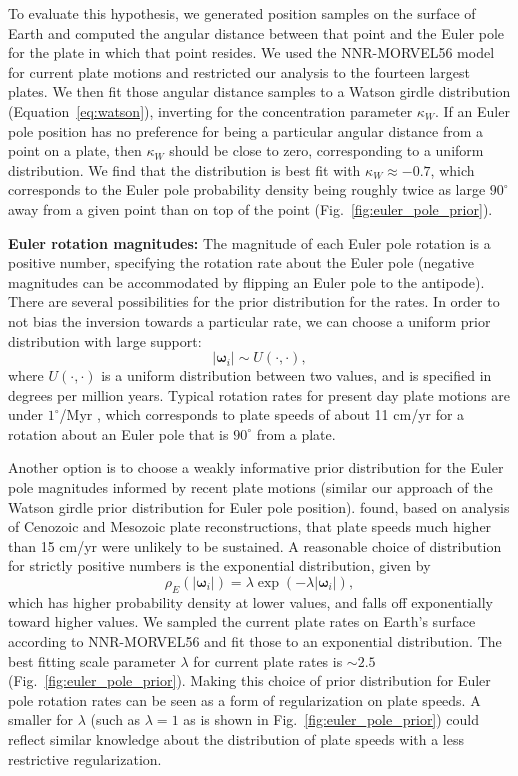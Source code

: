 \documentclass[]{agujournal2019}
\begin{document}
To evaluate this hypothesis, we generated position samples on the surface of Earth and computed the angular distance between that point and the Euler pole for the plate in which that point resides. We used the NNR-MORVEL56 model for current plate motions \cite{Argus2011a} and restricted our analysis to the fourteen largest plates. We then fit those angular distance samples to a Watson girdle distribution (Equation~\ref{eq:watson}),  inverting for the concentration parameter $\kappa_W$. If an Euler pole position has no preference for being a particular angular distance from a point on a plate, then $\kappa_W$ should be close to zero, corresponding to a uniform distribution. We find that the distribution is best fit with $\kappa_W \approx -0.7$, which corresponds to the Euler pole probability density being roughly twice as large $90^\circ$ away from a given point than on top of the point (Fig.~\ref{fig:euler_pole_prior}).

\textbf{Euler rotation magnitudes:} 
The magnitude of each Euler pole rotation is a positive number, specifying the rotation rate about the Euler pole (negative magnitudes can be accommodated by flipping an Euler pole to the antipode). There are several possibilities for the prior distribution for the rates. In order to not bias the inversion towards a particular rate, we can choose a uniform prior distribution with large support:
\begin{equation}
\vert \mathbf{\omega}_i \vert \sim U(\cdot, \cdot),
\end{equation}
where $U(\cdot, \cdot)$ is a uniform distribution between two values, and is specified in degrees per million years. Typical rotation rates for present day plate motions are under $1^\circ$/Myr \cite{Argus2011a}, which corresponds to plate speeds of about 11 cm/yr for a rotation about an Euler pole that is $90^\circ$ from a plate.

Another option is to choose a weakly informative prior distribution for the Euler pole magnitudes informed by recent plate motions (similar our approach of the Watson girdle prior distribution for Euler pole position).  found, based on analysis of Cenozoic and Mesozoic plate reconstructions, that plate speeds much higher than 15 cm/yr were unlikely to be sustained. A reasonable choice of distribution for strictly positive numbers is the exponential distribution, given by
\begin{equation}
\rho_E(\vert \mathbf{\omega}_i \vert) = \lambda \exp(-\lambda \vert \mathbf{\omega}_i \vert),
\end{equation}
which has higher probability density at lower values, and falls off exponentially toward higher values. We sampled the current plate rates on Earth's surface according to NNR-MORVEL56 and fit those to an exponential distribution. The best fitting scale parameter $\lambda$ for current plate rates is $\sim2.5$ (Fig.~\ref{fig:euler_pole_prior}). Making this choice of prior distribution for Euler pole rotation rates can be seen as a form of regularization on plate speeds. A smaller for $\lambda$ (such as $\lambda =1$ as is shown in Fig.~\ref{fig:euler_pole_prior}) could reflect similar knowledge about the distribution of plate speeds with a less restrictive regularization.
\end{document}
